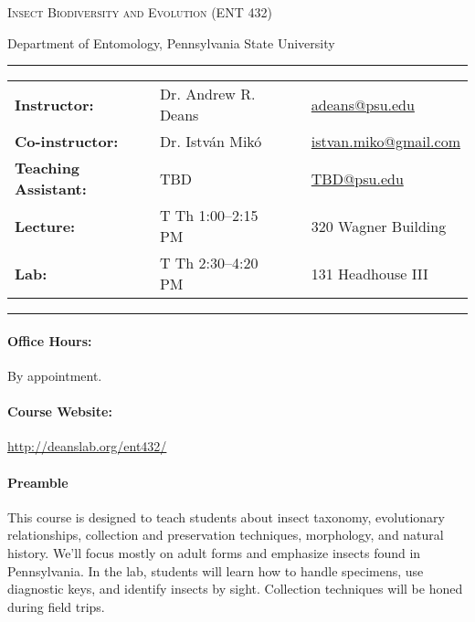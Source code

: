 \documentclass[11pt]{article}
\begin{document}
\begin{center}
{\Large \textsc{Insect Biodiversity and Evolution (ENT 432)}}
\end{center}
\begin{center}
Department of Entomology, Pennsylvania State University\end{center}

\begin{center}
\rule{6in}{0.4pt}
\begin{minipage}[t]{.74\textwidth}
\begin{tabular}{llcl}
\textbf{Instructor:} & Dr. Andrew R. Deans & &  \href{mailto:adeans@psu.edu}{adeans@psu.edu} \\
\textbf{Co-instructor:} & Dr. Istv\'an Mik\'o & &  \href{mailto:istvan.miko@gmail.com}{istvan.miko@gmail.com} \\
\textbf{Teaching Assistant:} & TBD & &  \href{mailto:TBD@psu.edu}{TBD@psu.edu} \\
\textbf{Lecture:} & T Th 1:00--2:15 PM & & 320 Wagner Building \\
\textbf{Lab:} & T Th 2:30--4:20 PM & & 131 Headhouse III \\
\end{tabular}
\end{minipage}
\rule{6in}{0.4pt}
\end{center}
\vspace{.3cm}
\setlength{\unitlength}{1in}
\renewcommand{\arraystretch}{2}

\paragraph{Office Hours:} By appointment.

\paragraph{Course Website:} \url{http://deanslab.org/ent432/}

\paragraph{Preamble}  This course is designed to teach students about insect taxonomy, evolutionary relationships, collection and preservation techniques, morphology, and natural history. We'll focus mostly on adult forms and emphasize insects found in Pennsylvania. In the lab, students will learn how to handle specimens, use diagnostic keys, and identify insects by sight. Collection techniques will be honed during field trips. 
\end{document}
